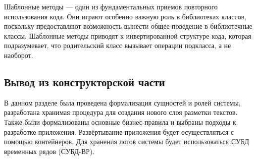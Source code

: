Шаблонные методы --- один из фундаментальных приемов повторного использования кода. Они играют особенно важную роль в библиотеках классов, поскольку предоставляют возможность вынести общее поведение в библиотечные классы. Шаблонные методы приводят к инвертированной структуре кода, которая подразумевает, что родительский класс вызывает операции подкласса, а не наоборот.



\subsection{Вывод из конструкторской части}

В данном разделе была проведена формализация сущностей и ролей системы, разработана хранимая процедура для создания нового слоя разметки текстов. Также были формализованы основные бизнес-правила и выбраны подходы к разработке приложения. Развёртывание приложения будет осуществляться с помощью контейнеров. Для хранения логов системы будет использоваться СУБД временных рядов (СУБД-ВР).



\pagebreak